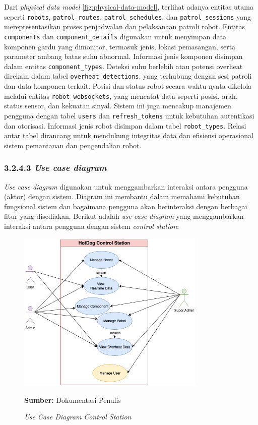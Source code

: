 Dari \emph{physical data model} \ref{fig:physical-data-model}, terlihat adanya entitas utama seperti \texttt{robots}, \texttt{patrol\_routes}, \texttt{patrol\_schedules}, dan \texttt{patrol\_sessions} yang merepresentasikan proses penjadwalan dan pelaksanaan patroli robot. Entitas \texttt{components} dan \texttt{component\_details} digunakan untuk menyimpan data komponen gardu yang dimonitor, termasuk jenis, lokasi pemasangan, serta parameter ambang batas suhu abnormal. Informasi jenis komponen disimpan dalam entitas \texttt{component\_types}. Deteksi suhu berlebih atau potensi overheat direkam dalam tabel \texttt{overheat\_detections}, yang terhubung dengan sesi patroli dan data komponen terkait. Posisi dan status robot secara waktu nyata dikelola melalui entitas \texttt{robot\_websockets}, yang mencatat data seperti posisi, arah, status sensor, dan kekuatan sinyal. Sistem ini juga mencakup manajemen pengguna dengan tabel \texttt{users} dan \texttt{refresh\_tokens} untuk kebutuhan autentikasi dan otorisasi. Informasi jenis robot disimpan dalam tabel \texttt{robot\_types}. Relasi antar tabel dirancang untuk mendukung integritas data dan efisiensi operasional sistem pemantauan dan pengendalian robot.

\subsubsection{3.2.4.3 \emph{Use case diagram}}
\emph{Use case diagram} digunakan untuk menggambarkan interaksi antara pengguna (aktor) dengan sistem. Diagram ini membantu dalam memahami kebutuhan fungsional sistem dan bagaimana pengguna akan berinteraksi dengan berbagai fitur yang disediakan. Berikut adalah \emph{use case diagram} yang menggambarkan interaksi antara pengguna dengan sistem \emph{control station}:

\begin{figure}[H]
  \centering
  \includegraphics[width=0.8\textwidth]{gambar/bab3/usecase.png}
  \caption{\emph{Use Case Diagram} \emph{Control Station}}
  \label{fig:use-case-diagram}
  \footnotesize{\textbf{Sumber:} Dokumentasi Penulis}
\end{figure}

